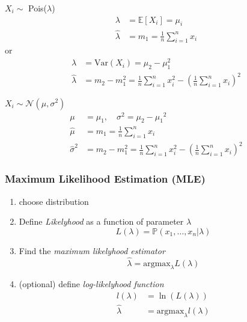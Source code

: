 \begin{examplesection}
    $X_i \sim$ Pois($\lambda$)
    \noindent\begin{align*}
        \lambda       & = \mathbb{E}[X_i] = \mu_i            \\
        \hat{\lambda} & = m_1 =\frac{1}{n}\sum_{i=1}^n {x_i}
    \end{align*}
    or
    \noindent\begin{align*}
        \lambda       & = \mathrm{Var}(X_i)=\mu_2-\mu_1^2                                                     \\
        \hat{\lambda} & =m_2-m_1^2=\frac{1}{n}\sum_{i=1}^n x_i^2-{\left(\frac{1}{n}\sum_{i=1}^n x_i\right)}^2
    \end{align*}

    $X_i \sim \mathcal{N}(\mu,\sigma^2)$
    \noindent\begin{align*}
        \mu            & = \mu_1, \quad \sigma^2 = \mu_2-{\mu_1}^2                                             \\
        \hat{\mu}      & =m_1=\frac{1}{n}\sum_{i=1}^n x_i                                                      \\
        \hat{\sigma}^2 & =m_2-m_1^2=\frac{1}{n}\sum_{i=1}^n x_i^2-{\left(\frac{1}{n}\sum_{i=1}^n x_i\right)}^2
    \end{align*}
\end{examplesection}

\subsubsection{Maximum Likelihood Estimation (MLE)}
\begin{enumerate}
    \item choose distribution
    \item Define \textit{Likelyhood} as a function of parameter $\lambda$
          \noindent\begin{equation*}
              L(\lambda) = \mathbb{P}(x_1,\ldots ,x_n|\lambda)
          \end{equation*}
    \item Find the \textit{maximum likelyhood estimator}
          \noindent\begin{equation*}
              \hat{\lambda} = \mathrm{argmax}_\lambda L(\lambda)
          \end{equation*}
    \item (optional) define \textit{log-likelyhood function}
          \noindent\begin{align*}
              l(\lambda)    & = \ln(L(\lambda))                    \\
              \hat{\lambda} & = \mathrm{argmax}_\lambda l(\lambda)
          \end{align*}
\end{enumerate}

